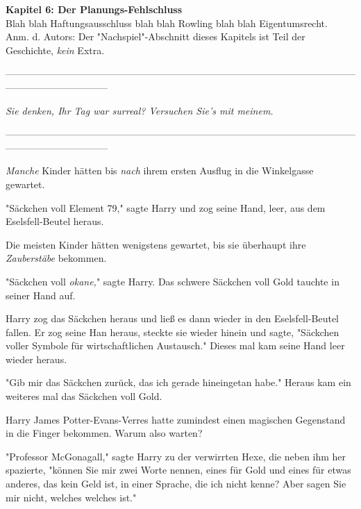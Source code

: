 

\hypertarget{der-planungs-fehlschluss}{%

\textbf{Kapitel 6: Der Planungs-Fehlschluss}\\

Blah blah Haftungsausschluss blah blah Rowling blah blah Eigentumsrecht.\\ Anm. d. Autors: Der "Nachspiel"-Abschnitt dieses Kapitels ist Teil der Geschichte, \emph{kein} Extra.

--------------------------------------------------------------------------------------------------------------------------------------------

\emph{Sie denken, Ihr Tag war surreal? Versuchen Sie's mit meinem.}

--------------------------------------------------------------------------------------------------------------------------------------------

\emph{Manche} Kinder hätten bis \emph{nach} ihrem ersten Ausflug in die Winkelgasse gewartet.

"Säckchen voll Element 79," sagte Harry und zog seine Hand, leer, aus dem Eselsfell-Beutel heraus.

Die meisten Kinder hätten wenigstens gewartet, bis sie überhaupt ihre \emph{Zauberstäbe} bekommen.

"Säckchen voll \emph{okane,}" sagte Harry. Das schwere Säckchen voll Gold tauchte in seiner Hand auf.

Harry zog das Säckchen heraus und ließ es dann wieder in den Eselsfell-Beutel fallen. Er zog seine Han heraus, steckte sie wieder hinein und sagte, "Säckchen voller Symbole für wirtschaftlichen Austausch." Dieses mal kam seine Hand leer wieder heraus.

"Gib mir das Säckchen zurück, das ich gerade hineingetan habe." Heraus kam ein weiteres mal das Säckchen voll Gold.

Harry James Potter-Evans-Verres hatte zumindest einen magischen Gegenstand in die Finger bekommen. Warum also warten?

"Professor McGonagall," sagte Harry zu der verwirrten Hexe, die neben ihm her spazierte, "können Sie mir zwei Worte nennen, eines für Gold und eines für etwas anderes, das kein Geld ist, in einer Sprache, die ich nicht kenne? Aber sagen Sie mir nicht, welches welches ist."

}
